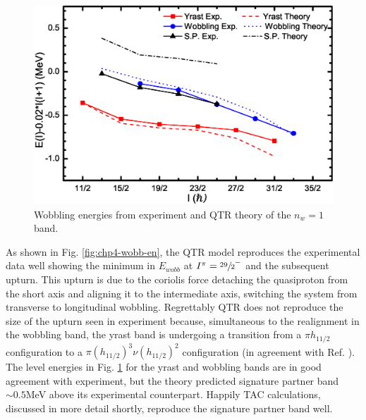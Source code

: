 \begin{figure}[b!]
\centerline{\includegraphics[width=\textwidth]{./img/c4/en_minus_rotor.eps}}
	\caption{Wobbling energies from experiment and QTR theory of the $n_w=1$ band.\label{fig:chp4-qtr-en-minus-rotor}}
\end{figure}

As shown in Fig. \ref{fig:chp4-wobb-en}, the QTR model reproduces the experimental data well showing the minimum in $E_{wobb}$ at $I^{\pi}=\sfrac{29}{2}^-$ and the subsequent upturn. This upturn is due to the coriolis force detaching the quasiproton from the short axis and aligning it to the intermediate axis, switching the system from transverse to longitudinal wobbling. Regrettably QTR does not reproduce the size of the upturn seen in experiment because, simultaneous to the realignment in the wobbling band, the yrast band is undergoing a transition from a $\pi{}h_{11/2}$ configuration to a $\pi(h_{11/2})^3\nu(h_{11/2})^2$ configuration (in agreement with Ref. \cite{ePaul135Pr}). The level energies in Fig. \ref{fig:chp4-qtr-en-minus-rotor} for the yrast and wobbling bands are in good agreement with experiment, but the theory predicted signature partner band $\sim0.5$MeV above its experimental counterpart. Happily TAC calculations, discussed in more detail shortly, reproduce the signature partner band well.

